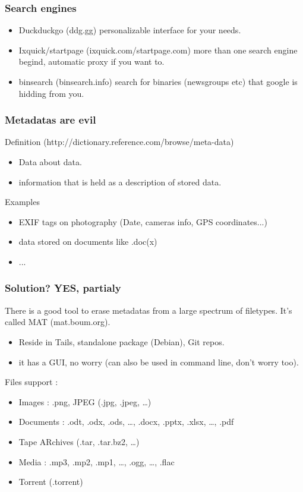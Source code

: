 \begin{frame}
\frametitle{Search engines}
\begin{itemize}
\item Duckduckgo (ddg.gg) personalizable interface for your needs.
\item Ixquick/startpage (ixquick.com/startpage.com) more than one search engine
begind, automatic proxy if you want to.
\item binsearch (binsearch.info) search for binaries (newsgroups etc) that
google is hidding from you.
\end{itemize}
\end{frame}
\begin{frame}
\frametitle{Metadatas are evil}
\begin{block}{Definition (http://dictionary.reference.com/browse/meta-data)}
\begin{itemize}
\item Data about data.
\item information that is held as a description of stored data.
\end{itemize}
\end{block}
\begin{block}{Examples}
\begin{itemize}
\item EXIF tags on photography (Date, cameras info, GPS coordinates...)
\item data stored on documents like .doc(x)
\item ...
\end{itemize}
\end{block}
\end{frame}
\begin{frame}
\frametitle{Solution? YES, partialy}
There is a good tool to erase metadatas from a large spectrum of filetypes.
It's called MAT (mat.boum.org).
\begin{itemize}
\item Reside in Tails, standalone package (Debian), Git repos.
\item it has a GUI, no worry (can also be used in command line, don't
 worry too).
\end{itemize}
Files support :
\begin{itemize}
\item Images : .png, JPEG (.jpg, .jpeg, …)
\item Documents : .odt, .odx, .ods, …, .docx, .pptx, .xlsx, …, .pdf
\item Tape ARchives (.tar, .tar.bz2, …)
\item Media : .mp3, .mp2, .mp1, …, .ogg, …, .flac
\item Torrent (.torrent)
\end{itemize}
\end{frame}

